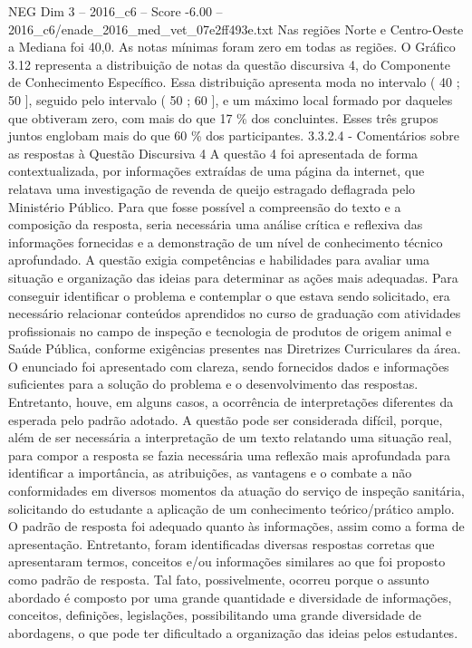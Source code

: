 \begin{textsample}{NEG Dim 3 – 2016\_c6 – Score -6.00 – 2016\_c6/enade\_2016\_med\_vet\_07e2ff493e.txt}
Nas regiões Norte e Centro-Oeste a Mediana foi 40,0.
As notas mínimas foram zero em todas as regiões.
O Gráfico 3.12 representa a distribuição de notas da questão discursiva 4, do Componente de Conhecimento Específico.
Essa distribuição apresenta moda no intervalo ( 40 ; 50 ], seguido pelo intervalo ( 50 ; 60 ], e um máximo local formado por daqueles que obtiveram zero, com mais do que 17 \% dos concluintes.
Esses três grupos juntos englobam mais do que 60 \% dos participantes. 3.3.2.4 - Comentários sobre as respostas à Questão Discursiva 4 A questão 4 foi apresentada de forma contextualizada, por informações extraídas de uma página da internet, que relatava uma investigação de revenda de queijo estragado deflagrada pelo Ministério Público.
Para que fosse possível a compreensão do texto e a composição da resposta, seria necessária uma análise crítica e reflexiva das informações fornecidas e a demonstração de um nível de conhecimento técnico aprofundado.
A questão exigia competências e habilidades para avaliar uma situação e organização das ideias para determinar as ações mais adequadas.
Para conseguir identificar o problema e contemplar o que estava sendo solicitado, era necessário relacionar conteúdos aprendidos no curso de graduação com atividades profissionais no campo de inspeção e tecnologia de produtos de origem animal e Saúde Pública, conforme exigências presentes nas Diretrizes Curriculares da área.
O enunciado foi apresentado com clareza, sendo fornecidos dados e informações suficientes para a solução do problema e o desenvolvimento das respostas.
Entretanto, houve, em alguns casos, a ocorrência de interpretações diferentes da esperada pelo padrão adotado.
A questão pode ser considerada difícil, porque, além de ser necessária a interpretação de um texto relatando uma situação real, para compor a resposta se fazia necessária uma reflexão mais aprofundada para identificar a importância, as atribuições, as vantagens e o combate a não conformidades em diversos momentos da atuação do serviço de inspeção sanitária, solicitando do estudante a aplicação de um conhecimento teórico/prático amplo.
O padrão de resposta foi adequado quanto às informações, assim como a forma de apresentação.
Entretanto, foram identificadas diversas respostas corretas que apresentaram termos, conceitos e/ou informações similares ao que foi proposto como padrão de resposta.
Tal fato, possivelmente, ocorreu porque o assunto abordado é composto por uma grande quantidade e diversidade de informações, conceitos, definições, legislações, possibilitando uma grande diversidade de abordagens, o que pode ter dificultado a organização das ideias pelos estudantes.

\end{textsample}
